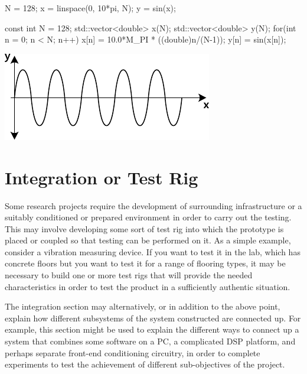 \begin{Float}%
  \begin{minipage}[b]{0.27\textwidth}\centering
    \begin{Matlab}
  N = 128;
  x = linspace(0, 10*pi, N);
  y = sin(x);
    \end{Matlab}
    \PlaceListingCaption
  \end{minipage}%
  \hspace{2mm}%
  \begin{minipage}[b]{0.40\textwidth}\centering
    \begin{Cpp}
  const int N = 128;
  std::vector<double> x(N);
  std::vector<double> y(N);
  for(int n = 0; n < N; n++){
    x[n] = 10.0*M_PI * ((double)n/(N-1));
    y[n] = sin(x[n]);
  }
    \end{Cpp}
    \PlaceListingCaption
  \end{minipage}
  \hspace{2mm}%
  \begin{minipage}[b]{0.29\textwidth}\centering
      \includegraphics[width=\textwidth]{../Figures/SinGraph}
    \PlaceFigureCaption
  \end{minipage}
\end{Float}%

\section{Integration or Test Rig}

Some research projects require the development of surrounding infrastructure or a suitably conditioned or prepared environment in order to carry out the testing. This may involve developing some sort of test rig into which the prototype is placed or coupled so that testing can be performed on it.  As a simple example, consider a vibration measuring device. If you want to test it in the lab, which has concrete floors but you want to test it for a range of flooring types, it may be necessary to build one or more test rigs that will provide the needed characteristics in order to test the product in a sufficiently authentic situation.

The integration section may alternatively, or in addition to the above point, explain how different subsystems of the system constructed are connected up.  For example, this section might be used to explain the different ways to connect up a system that combines some software on a PC, a complicated DSP platform, and perhaps separate front-end conditioning circuitry, in order to complete experiments to test the achievement of different sub-objectives of the project.

